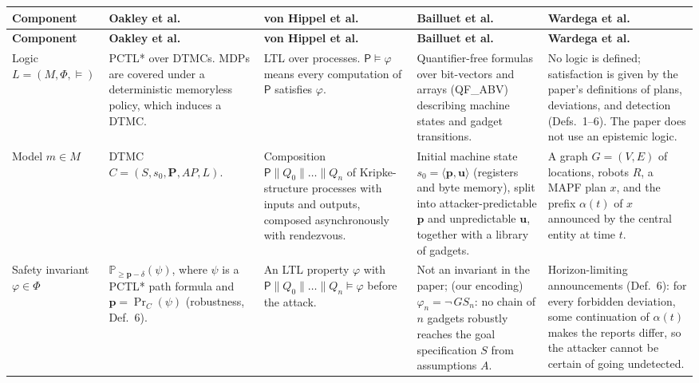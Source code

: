 \documentclass[11pt]{amsart}
\theoremstyle{definition}
\theoremstyle{remark}
\begin{document}
\begin{landscape}
\begingroup
\footnotesize
\setlength{\tabcolsep}{3pt}
\renewcommand{\arraystretch}{1.25}
\begin{longtable}{L{3.0cm} L{4.6cm} L{4.6cm} L{4.6cm} L{4.6cm}}
\toprule
\textbf{Component} & \textbf{Oakley et al.\ \cite{oakley}} & \textbf{von Hippel et al.\ \cite{vonhippel}} & \textbf{Bailluet et al.\ \cite{bailluet}} & \textbf{Wardega et al.\ \cite{wardega}} \\
\midrule
\endfirsthead
\toprule
\textbf{Component} & \textbf{Oakley et al.\ \cite{oakley}} & \textbf{von Hippel et al.\ \cite{vonhippel}} & \textbf{Bailluet et al.\ \cite{bailluet}} & \textbf{Wardega et al.\ \cite{wardega}} \\
\midrule
\endhead
Logic $L = (M, \Phi, \models)$ &
PCTL* over DTMCs. MDPs are covered under a deterministic memoryless policy, which induces a DTMC. &
LTL over processes. $\mathsf{P} \models \varphi$ means every computation of $\mathsf{P}$ satisfies $\varphi$. &
Quantifier-free formulas over bit-vectors and arrays (QF\_ABV) describing machine states and gadget transitions. &
No logic is defined; satisfaction is given by the paper's definitions of plans, deviations, and detection (Defs.~1--6). The paper does not use an epistemic logic. \\
\addlinespace
Model $m \in M$ &
DTMC $C = (S, s_0, \mathbf{P}, \mathit{AP}, L)$. &
Composition $\mathsf{P} \parallel Q_0 \parallel \dots \parallel Q_n$ of Kripke-structure processes with inputs and outputs, composed asynchronously with rendezvous. &
Initial machine state $s_0 = \langle \mathbf{p}, \mathbf{u} \rangle$ (registers and byte memory), split into attacker-predictable $\mathbf{p}$ and unpredictable $\mathbf{u}$, together with a library of gadgets. &
A graph $G = (V, E)$ of locations, robots $R$, a MAPF plan $x$, and the prefix $\alpha(t)$ of $x$ announced by the central entity at time $t$. \\
\addlinespace
Safety invariant $\varphi \in \Phi$ &
$\mathbb{P}_{\geq \mathbf{p} - \delta}(\psi)$, where $\psi$ is a PCTL* path formula and $\mathbf{p} = \Pr_C(\psi)$ (robustness, Def.~6). &
An LTL property $\varphi$ with $\mathsf{P} \parallel Q_0 \parallel \dots \parallel Q_n \models \varphi$ before the attack. &
Not an invariant in the paper; (our encoding) $\varphi_n = \neg\, GS_n$: no chain of $n$ gadgets robustly reaches the goal specification $S$ from assumptions $A$. &
Horizon-limiting announcements (Def.~6): for every forbidden deviation, some continuation of $\alpha(t)$ makes the reports differ, so the attacker cannot be certain of going undetected. \\

\end{longtable}
\end{landscape}
\end{document}
